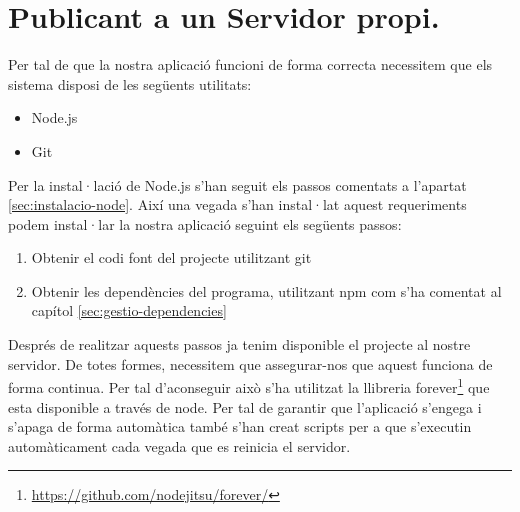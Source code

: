 \section{Publicant a un Servidor propi.}

Per tal de que la nostra aplicació funcioni de forma correcta necessitem que els sistema disposi de les següents utilitats:

\begin{itemize}
\item{Node.js}
\item{Git}
\end{itemize}

Per la instal·lació de Node.js s'han seguit els passos comentats a l'apartat \ref{sec:instalacio-node}. Així una vegada s'han instal·lat aquest requeriments podem instal·lar la nostra aplicació seguint els següents passos: 

\begin{enumerate}
\item{Obtenir el codi font del projecte utilitzant git}
\item{Obtenir les dependències del programa, utilitzant npm com s'ha comentat al capítol \ref{sec:gestio-dependencies}}
\end{enumerate}

Després de realitzar aquests passos ja tenim disponible el projecte al nostre servidor. De totes formes, necessitem que assegurar-nos que aquest funciona de forma continua. Per tal d'aconseguir això s'ha utilitzat la llibreria forever\footnote{\url{https://github.com/nodejitsu/forever/}} que esta disponible a través de node. Per tal de garantir que l'aplicació s'engega i s'apaga de forma automàtica també s'han creat scripts per a que s'executin automàticament cada vegada que es reinicia el servidor.

